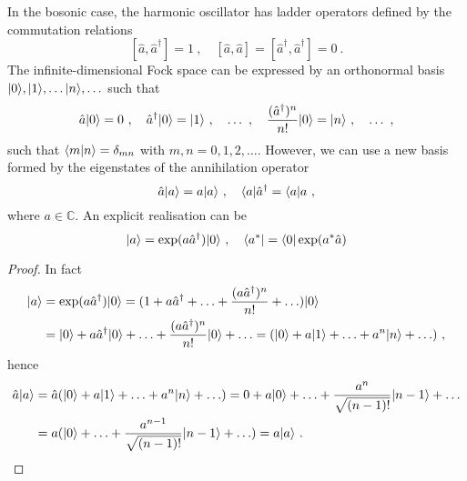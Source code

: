     In the bosonic case, the harmonic oscillator has ladder operators defined by the commutation relations
    \begin{equation}\label{f:comm}
        [\hat a, \hat a^\dagger] = 1 ~, \quad [\hat a, \hat a] = [\hat a^\dagger, \hat a^\dagger] = 0 ~.
    \end{equation}
    The infinite-dimensional Fock space can be expressed by an orthonormal basis $\vert0\rangle, \vert1\rangle, \ldots \vert n\rangle, \ldots$ such that
    \begin{equation*}
        \hat a \vert0\rangle = 0 ~, \quad \hat a^\dagger \vert0\rangle = \vert1\rangle ~, \quad \ldots ~, \quad \frac{(\hat a^\dagger)^n}{n!} \vert0\rangle = \vert n\rangle ~, \quad \ldots ~,
    \end{equation*}
    such that $\langle m\vert n\rangle = \delta_{mn}$ with $m, n = 0, 1, 2, \ldots$.
    However, we can use a new basis formed by the  eigenstates of the annihilation operator 
    \begin{equation*}
        \hat a \vert a\rangle = a \vert a\rangle ~, \quad \langle a\vert \hat a^\dagger = \langle a\vert a ~,
    \end{equation*}
    where $a \in \mathbb C$. An explicit realisation can be 
    \begin{equation*}
        \vert a\rangle = \exp(a \hat a^\dagger) \vert0\rangle ~, \quad \langle a^*\vert = \langle0\vert \exp(a^* \hat a)
    \end{equation*}
    \begin{proof}
        In fact 
        \begin{equation*}
        \begin{aligned}
            \vert a\rangle & = \exp(a \hat a^\dagger) \vert0\rangle = (1 + a \hat a^\dagger + \ldots + \frac{(a \hat a^\dagger)^n}{n!} + \ldots) \vert0\rangle \\ & =  \vert0\rangle + a \hat a^\dagger \vert0\rangle + \ldots + \frac{(a \hat a^\dagger)^n}{n!} \vert0\rangle + \ldots = (\vert0\rangle + a \vert1\rangle + \ldots + a^n \vert n\rangle + \ldots)  ~,
        \end{aligned}
        \end{equation*}
        hence 
        \begin{equation*}
        \begin{aligned}
            \hat a \vert a\rangle & = \hat a (\vert0\rangle + a \vert1\rangle + \ldots + a^n \vert n\rangle + \ldots) = 0 + a \vert0\rangle + \ldots + \frac{a^n}{\sqrt{(n-1)!}} \vert n-1\rangle + \ldots \\ & = a (\vert0\rangle + \ldots + \frac{a^{n-1}}{\sqrt{(n-1)!}} \vert n-1\rangle + \ldots) = a \vert a\rangle ~.
        \end{aligned}
        \end{equation*}
    \end{proof}
